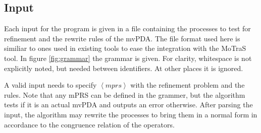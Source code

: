 

\subsection{Input}

Each input for the program is given in a file containing the processes
to test for refinement and the rewrite rules of the mvPDA.
The file format used here is similiar to ones used in existing
tools \cite{Sickert12} to ease the integration with the MoTraS tool.
In figure \ref{fig:grammar} the grammar is given. For clarity,
whitespace is not explicitly noted, but needed between identifiers.
At other places it is ignored.

A valid input needs to specify $\left< mprs \right>$ with the refinement problem and
the rules.
Note that any mPRS can be defined in the grammer, but the algorithm
tests if it is an actual mvPDA and outputs an error otherwise.
After parsing the input, the algorithm may rewrite the processes
to bring them in a normal form in accordance to the congruence relation
of the operators.

